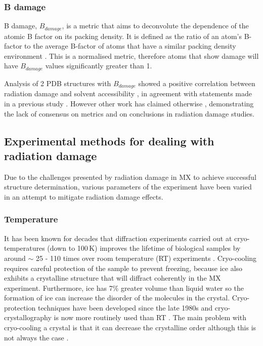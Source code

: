         \subsubsection{B damage}
        \label{subs:B damage}
            B damage, $B_{damage}$, is a metric that aims to deconvolute the dependence of the atomic B factor on its packing density.
			It is defined as the ratio of an atom's B-factor to the average B-factor of atoms that have a similar packing density environment \cite{gerstel2015identifying}.
			This is a normalised metric, therefore atoms that show damage will have $B_{damage}$ values significantly greater than 1.

            Analysis of 2 PDB structures with $B_{damage}$ showed a positive correlation between radiation damage and solvent accessibility \cite{gerstel2015identifying}, in agreement with statements made in a previous study \cite{sygusch1988}.
		    However other work has claimed otherwise \cite{coquelle2007activity,homer2011energy}, demonstrating the lack of consensus on metrics and on conclusions in radiation damage studies.

    \subsection{Experimental methods for dealing with radiation damage}
    \label{sub:Experimental methods for dealing with radiation damage}
        Due to the challenges presented by radiation damage in MX to achieve successful structure determination, various parameters of the experiment have been varied in an attempt to mitigate radiation damage effects.

        \subsubsection{Temperature}
        \label{subs:Temperature}
            It has been known for decades that diffraction experiments carried out at cryo-temperatures (down to 100\,K) improves the lifetime of biological samples \cite{henderson1990cryo,brooks2015nobel} by around $\sim$ 25 - 110 times over room temperature (RT) experiments \cite{south2007}.
            Cryo-cooling requires careful protection of the sample to prevent freezing, because ice also exhibits a crystalline structure that will diffract coherently in the MX experiment.
            Furthermore, ice has 7\% greater volume than liquid water so the formation of ice can increase the disorder of the molecules in the crystal.
            Cryo-protection techniques have been developed since the late 1980s \cite{garman1997macromolecular,hope1988cryocrystallography,teng1990mounting} and cryo-crystallography is now more routinely used than RT \cite{garman2014}.
            The main problem with cryo-cooling a crystal is that it can decrease the crystalline order \cite{nave2005} although this is not always the case \cite{garman1999cool}.

